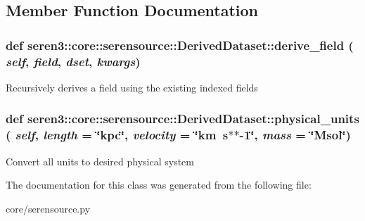 \subsection{Member Function Documentation}
\hypertarget{classseren3_1_1core_1_1serensource_1_1DerivedDataset_a6cc5ca97339ea76c136f834134fcb646}{
\subsubsection[{derive\_\-field}]{\setlength{\rightskip}{0pt plus 5cm}def seren3::core::serensource::DerivedDataset::derive\_\-field ( {\em self}, \/   {\em field}, \/   {\em dset}, \/   {\em kwargs})}}
\label{classseren3_1_1core_1_1serensource_1_1DerivedDataset_a6cc5ca97339ea76c136f834134fcb646}
\begin{DoxyVerb}
Recursively derives a field using the existing indexed fields
\end{DoxyVerb}
 \hypertarget{classseren3_1_1core_1_1serensource_1_1DerivedDataset_a8b974ae7797b73e51980cb30b737bad5}{
\subsubsection[{physical\_\-units}]{\setlength{\rightskip}{0pt plus 5cm}def seren3::core::serensource::DerivedDataset::physical\_\-units ( {\em self}, \/   {\em length} = {\ttfamily \char`\"{}kpc\char`\"{}}, \/   {\em velocity} = {\ttfamily \char`\"{}km~s$\ast$$\ast$-\/1\char`\"{}}, \/   {\em mass} = {\ttfamily \char`\"{}Msol\char`\"{}})}}
\label{classseren3_1_1core_1_1serensource_1_1DerivedDataset_a8b974ae7797b73e51980cb30b737bad5}
\begin{DoxyVerb}
Convert all units to desired physical system
\end{DoxyVerb}
 

The documentation for this class was generated from the following file:\begin{DoxyCompactItemize}
\item 
core/serensource.py\end{DoxyCompactItemize}
